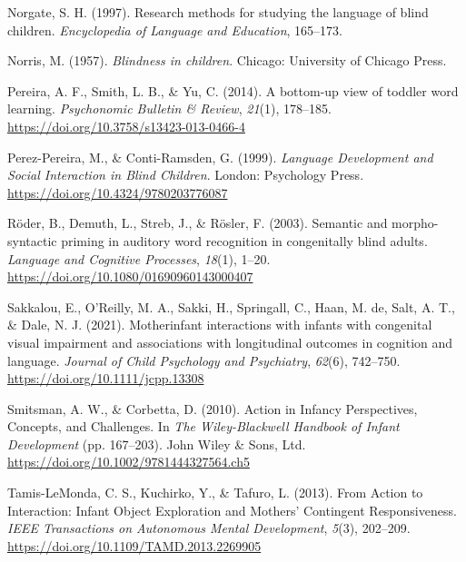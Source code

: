 \documentclass[
  man,floatsintext]{apa6}
\newlength{\cslhangindent}
\newlength{\cslentryspacingunit} %
\newenvironment{CSLReferences}[2] %
 {%
  \setlength{\parindent}{0pt}
  \ifodd #1
  \let\oldpar\par
  \def\par{\hangindent=\cslhangindent\oldpar}
  \fi
  \setlength{\parskip}{#2\cslentryspacingunit}
 }%
 {}
\begin{document}
\begin{CSLReferences}{1}{0}
\leavevmode{}%
Norgate, S. H. (1997). Research methods for studying the language of blind children. \emph{Encyclopedia of Language and Education}, 165--173.

\leavevmode{}%
Norris, M. (1957). \emph{Blindness in children}. {Chicago}: {University of Chicago Press}.

\leavevmode{}%
Pereira, A. F., Smith, L. B., \& Yu, C. (2014). A bottom-up view of toddler word learning. \emph{Psychonomic Bulletin \& Review}, \emph{21}(1), 178--185. \url{https://doi.org/10.3758/s13423-013-0466-4}

\leavevmode{}%
Perez-Pereira, M., \& Conti-Ramsden, G. (1999). \emph{Language {Development} and {Social Interaction} in {Blind Children}}. {London}: {Psychology Press}. \url{https://doi.org/10.4324/9780203776087}

\leavevmode{}%
Röder, B., Demuth, L., Streb, J., \& Rösler, F. (2003). Semantic and morpho-syntactic priming in auditory word recognition in congenitally blind adults. \emph{Language and Cognitive Processes}, \emph{18}(1), 1--20. \url{https://doi.org/10.1080/01690960143000407}

\leavevmode{}%
Sakkalou, E., O'Reilly, M. A., Sakki, H., Springall, C., Haan, M. de, Salt, A. T., \& Dale, N. J. (2021). Mother\textendash infant interactions with infants with congenital visual impairment and associations with longitudinal outcomes in cognition and language. \emph{Journal of Child Psychology and Psychiatry}, \emph{62}(6), 742--750. \url{https://doi.org/10.1111/jcpp.13308}

\leavevmode{}%
Smitsman, A. W., \& Corbetta, D. (2010). Action in {Infancy} \textendash{} {Perspectives}, {Concepts}, and {Challenges}. In \emph{The {Wiley-Blackwell Handbook} of {Infant Development}} (pp. 167--203). {John Wiley \& Sons, Ltd}. \url{https://doi.org/10.1002/9781444327564.ch5}

\leavevmode{}%
Tamis-LeMonda, C. S., Kuchirko, Y., \& Tafuro, L. (2013). From {Action} to {Interaction}: {Infant Object Exploration} and {Mothers}' {Contingent Responsiveness}. \emph{IEEE Transactions on Autonomous Mental Development}, \emph{5}(3), 202--209. \url{https://doi.org/10.1109/TAMD.2013.2269905}


\end{CSLReferences}
\end{document}
